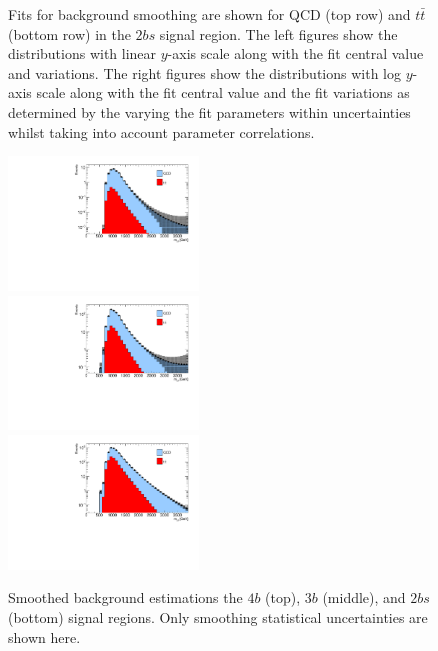 \begin{figure}[htbp!]
\begin{center}
\caption{Fits for background smoothing are shown for QCD (top row) and $t\bar{t}$ (bottom row) in the $2bs$ signal region.  The left figures show the distributions with linear $y$-axis scale along with the fit central value and variations. The right figures show the  distributions with log $y$-axis scale along with the fit central value and the fit variations as determined by the varying the fit parameters within uncertainties whilst taking into account parameter correlations. }
\label{fig:signal-region-2bs-smoothing}
\end{center}
\end{figure}


\begin{figure}[htbp!]
\begin{center}
\includegraphics[angle=270, width=0.45\textwidth]{figures/boosted/Smooth/FourTag_l_smoothed.pdf}\\
\includegraphics[angle=270, width=0.45\textwidth]{figures/boosted/Smooth/ThreeTag_l_smoothed.pdf}\\
\includegraphics[angle=270, width=0.45\textwidth]{figures/boosted/Smooth/TwoTag_split_l_smoothed.pdf}\\
\caption{Smoothed background estimations the $4b$ (top), $3b$ (middle), and $2bs$ (bottom) signal regions. Only smoothing statistical uncertainties are shown here. }
\label{fig:signal-region-smooth-bkg}
\end{center}
\end{figure}


